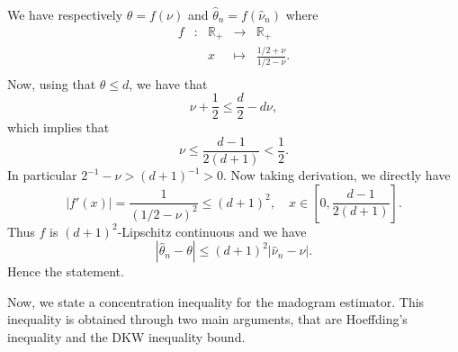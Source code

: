 \documentclass[11pt]{article}
\makeatletter
\renewenvironment{proof}[1][\proofname]{\par
\pushQED{\qed}%
\normalfont \topsep6\p@\@plus6\p@\relax
\trivlist
\item\relax
{\textbf{
#1\@addpunct{ }}}\hspace\labelsep\ignorespaces
}{%
\popQED\endtrivlist\@endpefalse
}
\makeatother
\begin{document}
	\begin{proof}
		We have respectively $\theta = f(\nu)$ and $\hat{\theta}_n = f(\hat{\nu}_n)$ where
		\begin{equation*}
			\begin{array}{ccccc}
f & : & \mathbb{R}_+ & \to & \mathbb{R}_+ \\
 & & x & \mapsto & \frac{1/2 + \nu}{1/2 - \nu}. \\
			\end{array}
		\end{equation*}
		Now, using that $\theta \leq d$, we have that
		\begin{equation*}
			\nu + \frac{1}{2} \leq \frac{d}{2} - d \nu,
		\end{equation*}
		which implies that
		\begin{equation*}
			\nu \leq \frac{d-1}{2(d+1)} < \frac{1}{2}.
		\end{equation*}
		In particular $2^{-1} - \nu > (d+1)^{-1} > 0$. Now taking derivation, we directly have
		\begin{equation*}
			|f'(x)| = \frac{1}{(1/2 - \nu)^2} \leq (d+1)^2, \quad x \in \left[0, \frac{d-1}{2(d+1)}\right].
		\end{equation*}
		Thus $f$ is $(d+1)^2$-Lipschitz continuous and we have
		\begin{equation*}
			|\hat{\theta}_n - \theta| \leq (d+1)^2 |\hat{\nu}_n - \nu|.
		\end{equation*}
		Hence the statement.
	\end{proof}
	
	Now, we state a concentration inequality for the madogram estimator. This inequality is obtained through two main arguments, that are Hoeffding's inequality and the DKW inequality bound.
	
\end{document}
